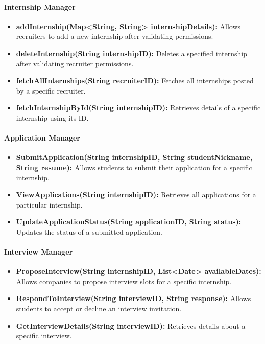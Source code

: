 \paragraph{Internship Manager}
\begin{itemize}
    \item \textbf{addInternship(Map<String, String> internshipDetails):} Allows recruiters to add a new internship after validating permissions.
    \item \textbf{deleteInternship(String internshipID):} Deletes a specified internship after validating recruiter permissions.
    \item \textbf{fetchAllInternships(String recruiterID):} Fetches all internships posted by a specific recruiter.
    \item \textbf{fetchInternshipById(String internshipID):} Retrieves details of a specific internship using its ID.
\end{itemize}

\paragraph{Application Manager}
\begin{itemize}
    \item \textbf{SubmitApplication(String internshipID, String studentNickname, String resume):} Allows students to submit their application for a specific internship.
    \item \textbf{ViewApplications(String internshipID):} Retrieves all applications for a particular internship.
    \item \textbf{UpdateApplicationStatus(String applicationID, String status):} Updates the status of a submitted application.
\end{itemize}

\paragraph{Interview Manager}
\begin{itemize}
    \item \textbf{ProposeInterview(String internshipID, List<Date> availableDates):} Allows companies to propose interview slots for a specific internship.
    \item \textbf{RespondToInterview(String interviewID, String response):} Allows students to accept or decline an interview invitation.
    \item \textbf{GetInterviewDetails(String interviewID):} Retrieves details about a specific interview.
\end{itemize}

